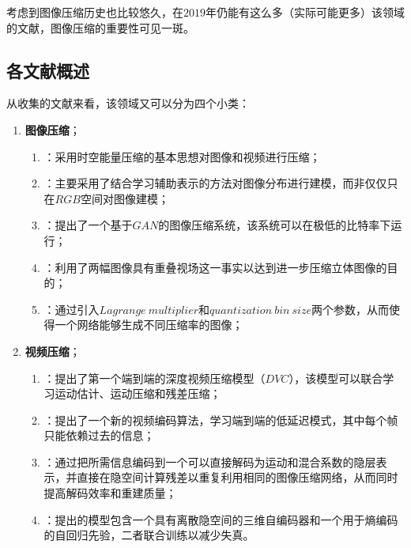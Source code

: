 \documentclass[UTF8]{ctexart}
\begin{document}
        \indent 考虑到图像压缩历史也比较悠久，在$2019$年仍能有这么多（实际可能更多）该领域的文献，图像压缩的重要性可见一斑。
        
        \subsection{各文献概述}
        
        \indent 从收集的文献来看，该领域又可以分为四个小类：

    			\begin{enumerate}[leftmargin=50pt]
    				\item \textbf{图像压缩}；
            			\begin{enumerate}[leftmargin=20pt]
            				\item \cite{cheng2019learning}：采用时空能量压缩的基本思想对图像和视频进行压缩；
                            \item \cite{mentzer2019practical}：主要采用了结合学习辅助表示的方法对图像分布进行建模，而非仅仅只在$RGB$空间对图像建模；
                            \item \cite{Agustsson_2019_ICCV}：提出了一个基于$GAN$的图像压缩系统，该系统可以在极低的比特率下运行；
                            \item \cite{Liu_2019_ICCV}：利用了两幅图像具有重叠视场这一事实以达到进一步压缩立体图像的目的；
                            \item \cite{Choi_2019_ICCV}：通过引入$ Lagrange\ multiplier$和$quantization\ bin\ size$两个参数，从而使得一个网络能够生成不同压缩率的图像；
            			\end{enumerate}                   
                    \item \textbf{视频压缩}；
            			\begin{enumerate}[leftmargin=20pt]
            				\item \cite{lu2019dvc}：提出了第一个端到端的深度视频压缩模型（$DVC$），该模型可以联合学习运动估计、运动压缩和残差压缩；
                            \item \cite{Rippel_2019_ICCV}：提出了一个新的视频编码算法，学习端到端的低延迟模式，其中每个帧只能依赖过去的信息；
                            \item \cite{Djelouah_2019_ICCV}：通过把所需信息编码到一个可以直接解码为运动和混合系数的隐层表示，并直接在隐空间计算残差以重复利用相同的图像压缩网络，从而同时提高解码效率和重建质量；
                            \item \cite{Habibian_2019_ICCV}：提出的模型包含一个具有离散隐空间的三维自编码器和一个用于熵编码的自回归先验，二者联合训练以减少失真。

\end{enumerate}
\end{enumerate}
\end{document}
